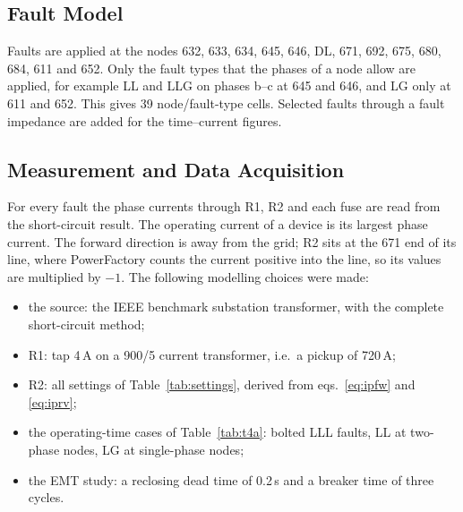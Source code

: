 \documentclass[12pt,a4paper]{article}
\newcommand{\PF}{PowerFactory}
\begin{document}
\subsection{Fault Model}
Faults are applied at the nodes 632, 633, 634, 645, 646, DL, 671, 692, 675, 680, 684, 611 and 652. Only the
fault types that the phases of a node allow are applied, for example LL and LLG on phases b--c at 645 and
646, and LG only at 611 and 652. This gives 39 node/fault-type cells. Selected faults
through a fault impedance are added for the time--current figures.

\subsection{Measurement and Data Acquisition}
\label{sec:assumptions}
For every fault the phase currents through R1, R2 and each fuse are read from the short-circuit result. The
operating current of a device is its largest phase current. The forward direction is away from the grid; R2
sits at the 671 end of its line, where \PF{} counts the current positive into the line, so its values are
multiplied by $-1$. The following modelling choices were made:
\begin{itemize}
\item the source: the IEEE benchmark substation transformer, with the complete short-circuit method;
\item R1: tap 4\,A on a 900/5 current transformer, i.e.\ a pickup of 720\,A;
\item R2: all settings of Table~\ref{tab:settings}, derived from eqs.~\eqref{eq:ipfw} and \eqref{eq:iprv};
\item the operating-time cases of Table~\ref{tab:t4a}: bolted LLL faults, LL at two-phase nodes, LG at single-phase nodes;
\item the EMT study: a reclosing dead time of 0.2\,s and a breaker time of three cycles.
\end{itemize}
\end{document}
